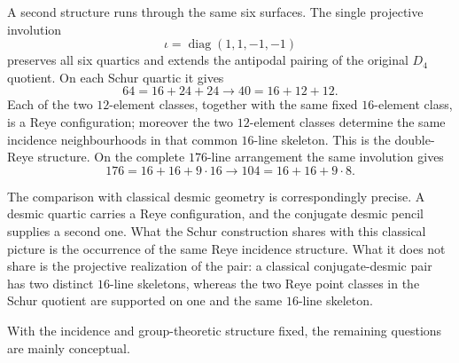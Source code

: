 \documentclass[10pt]{article}
\begin{document}
A second structure runs through the same six surfaces.  The single
projective involution
\[
\iota=\operatorname{diag}(1,1,-1,-1)
\]
preserves all six quartics and extends the antipodal pairing of the original
$D_4$ quotient.  On each Schur quartic it gives
\[
64=16+24+24
\longrightarrow
40=16+12+12.
\]
Each of the two $12$-element classes, together with the same fixed
$16$-element class, is a Reye configuration; moreover the two
$12$-element classes determine the same incidence neighbourhoods in that
common $16$-line skeleton.  This is the double-Reye structure.  On the
complete $176$-line arrangement the same involution gives
\[
176=16+16+9\cdot16
\longrightarrow
104=16+16+9\cdot8.
\]

The comparison with classical desmic geometry is correspondingly precise.
A desmic quartic carries a Reye configuration, and the conjugate desmic
pencil supplies a second one.  What the Schur construction shares with this
classical picture is the occurrence of the same Reye incidence structure.
What it does not share is the projective realization of the pair: a
classical conjugate-desmic pair has two distinct $16$-line skeletons,
whereas the two Reye point classes in the Schur quotient are supported on
one and the same $16$-line skeleton.

With the incidence and group-theoretic structure fixed, the remaining
questions are mainly conceptual.
\end{document}

